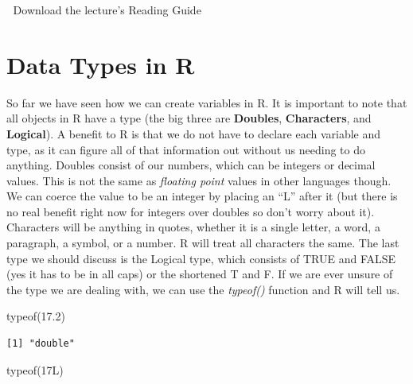\documentclass[
  letterpaper,
  DIV=11,
  numbers=noendperiod]{scrreprt}
\newenvironment{Shaded}{\begin{snugshade}}{\end{snugshade}}
\newcommand{\DecValTok}[1]{\textcolor[rgb]{0.68,0.00,0.00}{#1}}
\newcommand{\FloatTok}[1]{\textcolor[rgb]{0.68,0.00,0.00}{#1}}
\newcommand{\FunctionTok}[1]{\textcolor[rgb]{0.28,0.35,0.67}{#1}}
\newcommand{\NormalTok}[1]{\textcolor[rgb]{0.00,0.23,0.31}{#1}}
\begin{document}
\begin{tcolorbox}[enhanced jigsaw, leftrule=.75mm, arc=.35mm, coltitle=black, rightrule=.15mm, bottomrule=.15mm, toprule=.15mm, left=2mm, colbacktitle=quarto-callout-tip-color!10!white, title=\textcolor{quarto-callout-tip-color}{\faLightbulb}\hspace{0.5em}{Supplemental Material}, toptitle=1mm, breakable, colframe=quarto-callout-tip-color-frame, bottomtitle=1mm, titlerule=0mm, colback=white, opacityback=0, opacitybacktitle=0.6]

📄 Download the lecture's Reading Guide

\end{tcolorbox}

\section{Data Types in R}\label{data-types-in-r}

So far we have seen how we can create variables in R. It is important to
note that all objects in R have a type (the big three are
\textbf{Doubles}, \textbf{Characters}, and \textbf{Logical}). A benefit
to R is that we do not have to declare each variable and type, as it can
figure all of that information out without us needing to do anything.
Doubles consist of our numbers, which can be integers or decimal values.
This is not the same as \emph{floating point} values in other languages
though. We can coerce the value to be an integer by placing an ``L''
after it (but there is no real benefit right now for integers over
doubles so don't worry about it). Characters will be anything in quotes,
whether it is a single letter, a word, a paragraph, a symbol, or a
number. R will treat all characters the same. The last type we should
discuss is the Logical type, which consists of TRUE and FALSE (yes it
has to be in all caps) or the shortened T and F. If we are ever unsure
of the type we are dealing with, we can use the \emph{typeof()} function
and R will tell us.

\begin{Shaded}
\begin{Highlighting}[]
\FunctionTok{typeof}\NormalTok{(}\FloatTok{17.2}\NormalTok{)}
\end{Highlighting}
\end{Shaded}

\begin{verbatim}
[1] "double"
\end{verbatim}

\begin{Shaded}
\begin{Highlighting}[]
\FunctionTok{typeof}\NormalTok{(}\DecValTok{17}\NormalTok{L)}
\end{Highlighting}
\end{Shaded}
\end{document}
